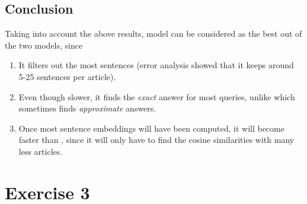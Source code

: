 \documentclass[12pt]{report}
\begin{document}
\subsection*{Conclusion}
Taking into account the above results, model  can be considered
as the best out of the two models, since
\begin{enumerate}
    \item It filters out the most sentences (error analysis showed that it keeps
        around 5-25 sentences per article).
    \item Even though slower, it finds the \textit{exact} answer for most queries,
        unlike  which sometimes finds
        \textit{approximate} answers.
    \item Once most sentence embeddings will have been computed, 
        it will become faster than , since it
        will only have to find the cosine similarities with many less articles.
\end{enumerate} \clearpage


\section*{Exercise 3}
\end{document}
